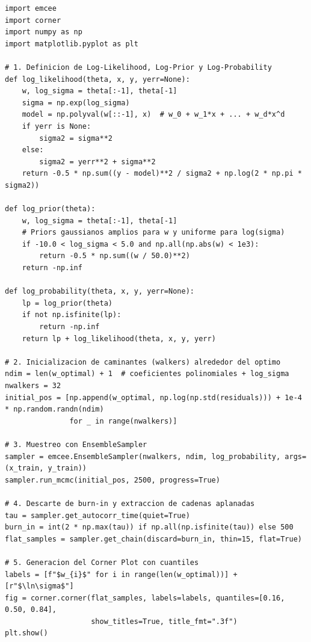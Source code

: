 \documentclass[11pt,a4paper]{article}
\begin{document}
\begin{lstlisting}[caption={Esqueleto orientativo de muestreo Bayesiano MCMC con \texttt{emcee} y visualizaci\'on con \texttt{corner}.}, label={lst:mcmc}]
import emcee
import corner
import numpy as np
import matplotlib.pyplot as plt

# 1. Definicion de Log-Likelihood, Log-Prior y Log-Probability
def log_likelihood(theta, x, y, yerr=None):
    w, log_sigma = theta[:-1], theta[-1]
    sigma = np.exp(log_sigma)
    model = np.polyval(w[::-1], x)  # w_0 + w_1*x + ... + w_d*x^d
    if yerr is None:
        sigma2 = sigma**2
    else:
        sigma2 = yerr**2 + sigma**2
    return -0.5 * np.sum((y - model)**2 / sigma2 + np.log(2 * np.pi * sigma2))

def log_prior(theta):
    w, log_sigma = theta[:-1], theta[-1]
    # Priors gaussianos amplios para w y uniforme para log(sigma)
    if -10.0 < log_sigma < 5.0 and np.all(np.abs(w) < 1e3):
        return -0.5 * np.sum((w / 50.0)**2)
    return -np.inf

def log_probability(theta, x, y, yerr=None):
    lp = log_prior(theta)
    if not np.isfinite(lp):
        return -np.inf
    return lp + log_likelihood(theta, x, y, yerr)

# 2. Inicializacion de caminantes (walkers) alrededor del optimo
ndim = len(w_optimal) + 1  # coeficientes polinomiales + log_sigma
nwalkers = 32
initial_pos = [np.append(w_optimal, np.log(np.std(residuals))) + 1e-4 * np.random.randn(ndim) 
               for _ in range(nwalkers)]

# 3. Muestreo con EnsembleSampler
sampler = emcee.EnsembleSampler(nwalkers, ndim, log_probability, args=(x_train, y_train))
sampler.run_mcmc(initial_pos, 2500, progress=True)

# 4. Descarte de burn-in y extraccion de cadenas aplanadas
tau = sampler.get_autocorr_time(quiet=True)
burn_in = int(2 * np.max(tau)) if np.all(np.isfinite(tau)) else 500
flat_samples = sampler.get_chain(discard=burn_in, thin=15, flat=True)

# 5. Generacion del Corner Plot con cuantiles
labels = [f"$w_{i}$" for i in range(len(w_optimal))] + [r"$\ln\sigma$"]
fig = corner.corner(flat_samples, labels=labels, quantiles=[0.16, 0.50, 0.84],
                    show_titles=True, title_fmt=".3f")
plt.show()
\end{lstlisting}

\end{document}
